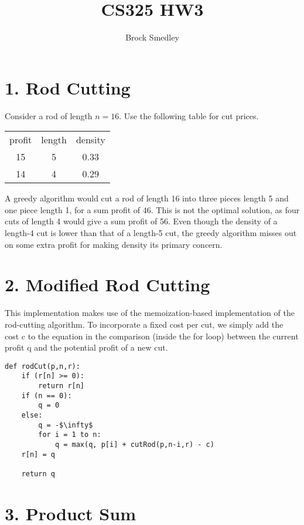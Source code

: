 \documentclass[10pt,a4paper]{report}
\author{Brock Smedley}
\title{CS325 HW3}
\begin{document}
	\maketitle
	
	\section*{1. Rod Cutting}
	Consider a rod of length $n = 16$. Use the following table for cut prices.
	
	\begin{center}
		\begin{tabular}{ c c c }
			profit	& length 	& density \\ 
			15	 	& 5		 	& 0.33 \\  
			14 		& 4 		& 0.29
		\end{tabular}
	\end{center}
	
	A greedy algorithm would cut a rod of length 16 into three pieces length 5 and one piece length 1, for a sum profit of 46. This is not the optimal solution, as four cuts of length 4 would give a sum profit of 56. Even though the density of a length-4 cut is lower than that of a length-5 cut, the greedy algorithm misses out on some extra profit for making density its primary concern.
	
	
	\section*{2. Modified Rod Cutting}
	This implementation makes use of the memoization-based implementation of the rod-cutting algorithm. To incorporate a fixed cost per cut, we simply add the cost c to the equation in the comparison (inside the for loop) between the current profit q and the potential profit of a new cut.
	\\
		
	\begin{lstlisting}[tabsize=4, mathescape=true]
def rodCut(p,n,r):
	if (r[n] >= 0):
		return r[n]
	if (n == 0):
		q = 0
	else:
		q = -$\infty$
		for i = 1 to n:
			q = max(q, p[i] + cutRod(p,n-i,r) - c)
	r[n] = q
	
	return q

	\end{lstlisting}
	
	\newpage
	\section*{3. Product Sum}
\end{document}
